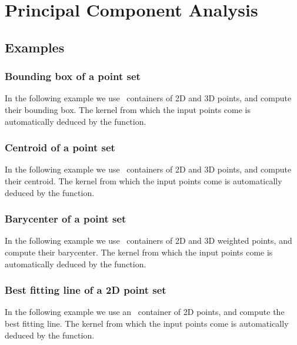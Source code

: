 \chapter{Principal Component Analysis}
\label{chap:pca}


\minitoc


% 

\section{Examples}
\label{subsec:pca_examples}

\subsection{Bounding box of a point set}

In the following example we use \stl\ containers of 2D and 3D points, and
compute their bounding box. The kernel from which the input points
come is automatically deduced by the function.


\subsection{Centroid of a point set}

In the following example we use \stl\ containers of 2D and 3D points, and
compute their centroid. The kernel from which the input points
come is automatically deduced by the function.


\subsection{Barycenter of a point set}

In the following example we use \stl\ containers of 2D and 3D weighted points,
and compute their barycenter. The kernel from which the input points come is
automatically deduced by the function.


\subsection{Best fitting line of a 2D point set}

In the following example we use an \stl\ container of 2D points, and
compute the best fitting line. The kernel from which the input points
come is automatically deduced by the function.



